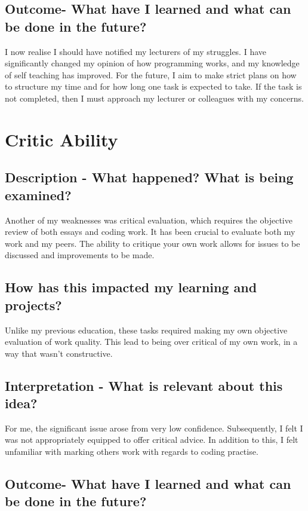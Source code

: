 \documentclass{scrartcl}
\begin{document}
\subsection{Outcome- What have I learned and what can be done in the future?}

I now realise I should have notified my lecturers of my struggles. I have significantly changed my opinion of how programming works, and my knowledge of self teaching has improved. For the future, I aim to make strict plans on how to structure my time and for how long one task is expected to take. If the task is not completed, then I must approach my lecturer or colleagues with my concerns.


\section{Critic Ability}

\subsection{Description - What happened? What is being examined?}

Another of my weaknesses was critical evaluation, which requires the objective review of both essays and coding work. It has been crucial to evaluate both my work and my peers. The ability to critique your own work allows for issues to be discussed and improvements to be made.

\subsection{How has this impacted my learning and projects?}

Unlike my previous education, these tasks required making my own objective evaluation of work quality. This lead to being over critical of my own work, in a way that wasn't constructive.

\subsection{Interpretation - What is relevant about this idea?}

For me, the significant issue arose from very low confidence. Subsequently, I felt I was not appropriately equipped to offer critical advice. In addition to this, I felt unfamiliar with marking others work with regards to coding practise.

\subsection{Outcome- What have I learned and what can be done in the future?}
\end{document}
